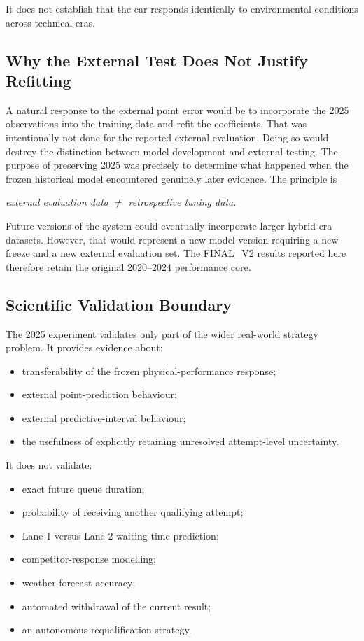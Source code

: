 It does not establish that the car responds identically to environmental conditions across technical eras.

\subsection{Why the External Test Does Not Justify Refitting}
A natural response to the external point error would be to incorporate the 2025 observations into the training data and refit the coefficients. That was intentionally not done for the reported external evaluation. Doing so would destroy the distinction between model development and external testing. The purpose of preserving 2025 was precisely to determine what happened when the frozen historical model encountered genuinely later evidence. The principle is

\begin{center}\textit{external evaluation data \ensuremath{\neq} retrospective tuning data.}\end{center}

Future versions of the system could eventually incorporate larger hybrid-era datasets. However, that would represent a new model version requiring a new freeze and a new external evaluation set. The FINAL\_V2 results reported here therefore retain the original 2020--2024 performance core.

\subsection{Scientific Validation Boundary}
The 2025 experiment validates only part of the wider real-world strategy problem. It provides evidence about:

\begin{itemize}
\item transferability of the frozen physical-performance response;
\item external point-prediction behaviour;
\item external predictive-interval behaviour;
\item the usefulness of explicitly retaining unresolved attempt-level uncertainty.
\end{itemize}

It does not validate:

\begin{itemize}
\item exact future queue duration;
\item probability of receiving another qualifying attempt;
\item Lane 1 versus Lane 2 waiting-time prediction;
\item competitor-response modelling;
\item weather-forecast accuracy;
\item automated withdrawal of the current result;
\item an autonomous requalification strategy.
\end{itemize}

